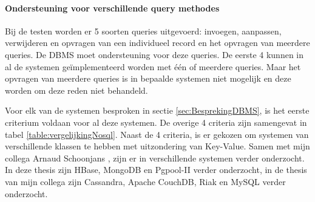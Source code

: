 \paragraph{Ondersteuning voor verschillende query methodes} Bij de testen worden er 5 soorten queries uitgevoerd: invoegen, aanpassen, verwijderen en opvragen van een individueel record en het opvragen van meerdere queries. De DBMS moet ondersteuning voor deze queries. De eerste 4 kunnen in al de systemen geïmplementeerd worden met één of meerdere queries. Maar het opvragen van meerdere queries is in bepaalde systemen niet mogelijk en deze worden om deze reden niet behandeld. 

Voor elk van de systemen besproken in sectie \ref{sec:BesprekingDBMS}, is het eerste criterium voldaan voor al deze systemen. De overige 4 criteria zijn samengevat in tabel \ref{table:vergelijkingNosql}. Naast de 4 criteria, is er gekozen om systemen van verschillende klassen te hebben met uitzondering van Key-Value. Samen met mijn collega Arnaud Schoonjans \cite{thesisArnaud}, zijn er in verschillende systemen verder onderzocht. In deze thesis zijn  HBase, MongoDB en Pgpool-II verder onderzocht, in de thesis van mijn collega zijn Cassandra, Apache CouchDB, Riak en MySQL verder onderzocht.  
 
